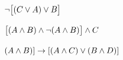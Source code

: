 \begin{compactlist}
\item $\neg\bigl[(C\vee A) \vee B\bigr]$\vspace{.5ex} 						
%
%
%

\item $\bigl[(A\wedge B) \wedge\neg(A\wedge B)\bigr] \wedge C$ \vspace{.5ex}	
%
%
%
%
%
\item $(A \wedge B) ]\rightarrow[(A \wedge C) \vee (B \wedge D)]$ \vspace{.5ex}		
%
%
%
\end{compactlist}

